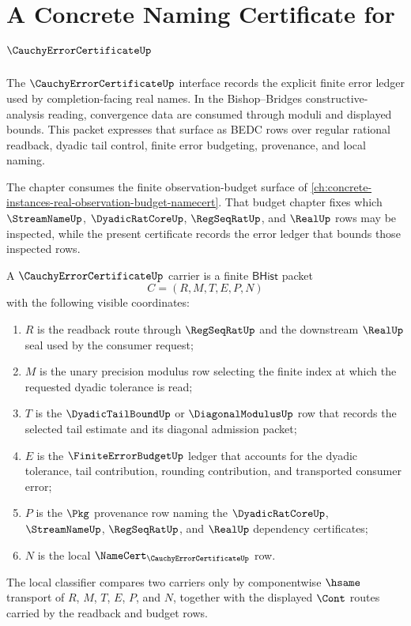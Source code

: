 \chapter{A Concrete Naming Certificate for $\CauchyErrorCertificateUp$}
\label{ch:concrete-instances-cauchyerrorcertificate-namecert}

The $\CauchyErrorCertificateUp$ interface records the explicit finite error ledger used by completion-facing real names. In the Bishop--Bridges constructive-analysis reading, convergence data are consumed through moduli and displayed bounds. This packet expresses that surface as BEDC rows over regular rational readback, dyadic tail control, finite error budgeting, provenance, and local naming.

The chapter consumes the finite observation-budget surface of \autoref{ch:concrete-instances-real-observation-budget-namecert}. That budget chapter fixes which $\StreamNameUp$, $\DyadicRatCoreUp$, $\RegSeqRatUp$, and $\RealUp$ rows may be inspected, while the present certificate records the error ledger that bounds those inspected rows.

\begin{definition}
\label{def:cauchy-error-certificate-carrier}
A $\CauchyErrorCertificateUp$ carrier is a finite $\mathsf{BHist}$ packet
$$
C=(R,M,T,E,P,N)
$$
with the following visible coordinates:
\begin{enumerate}
\item $R$ is the readback route through $\RegSeqRatUp$ and the downstream $\RealUp$ seal used by the consumer request;
\item $M$ is the unary precision modulus row selecting the finite index at which the requested dyadic tolerance is read;
\item $T$ is the $\DyadicTailBoundUp$ or $\DiagonalModulusUp$ row that records the selected tail estimate and its diagonal admission packet;
\item $E$ is the $\FiniteErrorBudgetUp$ ledger that accounts for the dyadic tolerance, tail contribution, rounding contribution, and transported consumer error;
\item $P$ is the $\Pkg$ provenance row naming the $\DyadicRatCoreUp$, $\StreamNameUp$, $\RegSeqRatUp$, and $\RealUp$ dependency certificates;
\item $N$ is the local $\NameCert_{\CauchyErrorCertificateUp}$ row.
\end{enumerate}
The local classifier compares two carriers only by componentwise $\hsame$ transport of $R$, $M$, $T$, $E$, $P$, and $N$, together with the displayed $\Cont$ routes carried by the readback and budget rows.
\end{definition}

